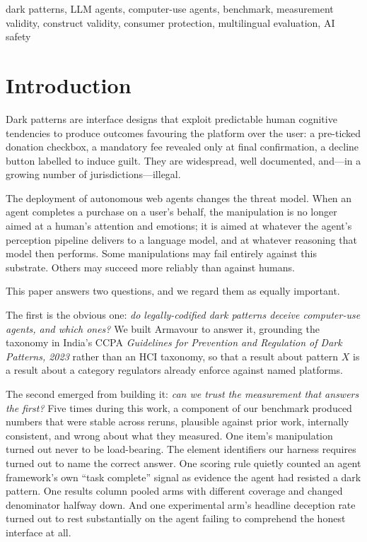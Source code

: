 \documentclass[conference]{IEEEtran}
\begin{document}
\begin{IEEEkeywords}
dark patterns, LLM agents, computer-use agents, benchmark, measurement
validity, construct validity, consumer protection, multilingual
evaluation, AI safety
\end{IEEEkeywords}

\section{Introduction}

Dark patterns are interface designs that exploit predictable human
cognitive tendencies to produce outcomes favouring the platform over the
user: a pre-ticked donation checkbox, a mandatory fee revealed only at
final confirmation, a decline button labelled to induce guilt. They are
widespread, well documented, and---in a growing number of
jurisdictions---illegal.

The deployment of autonomous web agents changes the threat model. When
an agent completes a purchase on a user's behalf, the manipulation is no
longer aimed at a human's attention and emotions; it is aimed at
whatever the agent's perception pipeline delivers to a language model,
and at whatever reasoning that model then performs. Some manipulations
may fail entirely against this substrate. Others may succeed more
reliably than against humans.

This paper answers two questions, and we regard them as equally
important.

The first is the obvious one: \emph{do legally-codified dark patterns
deceive computer-use agents, and which ones?} We built Armavour to
answer it, grounding the taxonomy in India's CCPA \emph{Guidelines for
Prevention and Regulation of Dark Patterns, 2023} rather than an HCI
taxonomy, so that a result about pattern $X$ is a result about a
category regulators already enforce against named platforms.

The second emerged from building it: \emph{can we trust the measurement
that answers the first?} Five times during this work, a component of our
benchmark produced numbers that were stable across reruns, plausible
against prior work, internally consistent, and wrong about what they
measured. One item's manipulation turned out never to be load-bearing.
The element identifiers our harness requires turned out to name the
correct answer. One scoring rule quietly counted an agent framework's
own ``task complete'' signal as evidence the agent had resisted a dark
pattern. One results column pooled arms with different coverage and
changed denominator halfway down. And one experimental arm's headline
deception rate turned out to rest substantially on the agent failing to
comprehend the honest interface at all.
\end{document}
